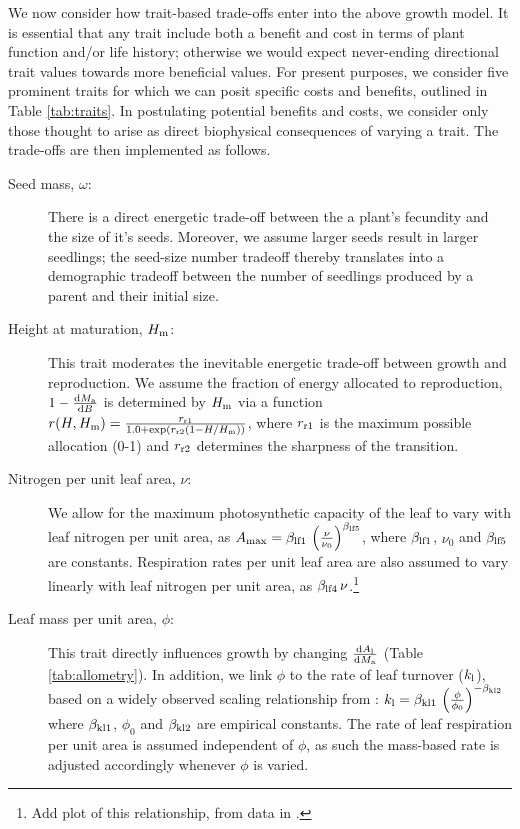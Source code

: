 \documentclass[a4paper,11pt]{article}
\begin{document}
We now consider how trait-based trade-offs enter into the above growth model. It is essential that any trait include both a benefit and cost in terms of plant function and/or life history; otherwise we would expect never-ending directional trait values towards more beneficial values. For present purposes, we consider five prominent traits for which we can posit specific costs and benefits, outlined in Table \ref{tab:traits}. In postulating potential benefits and costs, we consider only those thought to arise as direct biophysical consequences of varying a trait. The trade-offs are then implemented as follows.
\begin{description}
\item[Seed mass, $\omega$:] There is a direct energetic trade-off between the a plant's fecundity and the size of it's seeds. Moreover, we assume larger seeds result in larger seedlings; the seed-size number tradeoff thereby translates into a demographic tradeoff between the number of seedlings produced by a parent and their initial size.

\item[Height at maturation, $H_{\rm m}$:] This trait moderates the inevitable energetic trade-off between growth and reproduction. We assume the fraction of energy allocated to reproduction, $1- \frac{{\rm d}M_{{\rm a}}}{{\rm d}B}$ is determined by $H_{\rm m}$ via a function $r(H, H_{\rm m}) = \frac{r_{\rm r1}} {1.0 + \exp\left(r_{\rm r2} \left(1 - H / H_{\rm m}\right)\right)}$, where $r_{\rm r1}$ is the maximum possible allocation (0-1) and $r_{\rm r2}$ determines the sharpness of the transition.

\item[Nitrogen per unit leaf area,  $\nu$:] We allow for the maximum photosynthetic capacity of the leaf to vary with leaf nitrogen per unit area, as $A_{\rm max} = \beta_{{\rm lf1}} \, \left(\frac{\nu}{\nu_0}\right)^{\beta_{{\rm lf5}}}$, where $\beta_{{\rm lf1}}$, $\nu_0$ and $\beta_{{\rm lf5}}$ are constants. Respiration rates per unit leaf area are also assumed to vary linearly with leaf nitrogen per unit area, as $\beta_{{\rm lf4}}\, \nu$.\footnote{Add plot of this relationship, from data in \citet{Wright-2004}.}

\item[Leaf mass per unit area, $\phi$:] This trait directly influences growth by changing $\frac{{\rm d}A_{\rm l}}{{\rm d}M_{\rm a}}$ (Table \ref{tab:allometry}). In addition, we link $\phi$ to the rate of leaf turnover ($k_{\rm l}$), based on a widely observed scaling relationship from \citet{Wright-2004}: $k_{\rm l} = \beta_{{\rm kl1}} \, \left(\frac{\phi}{\phi_0}\right)^{-\beta_{{\rm kl2}}}$ where $\beta_{{\rm kl1}}$, $\phi_0$ and $\beta_{{\rm kl2}}$ are empirical constants. The rate of leaf respiration per unit area is assumed independent of $\phi$, as such the mass-based rate is adjusted accordingly whenever $\phi$ is varied.



\end{description}
\end{document}
